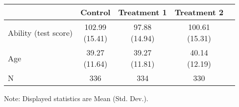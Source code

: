 \renewcommand\cellalign{t}
\begin{threeparttable}
\begin{tabular}{lcccc}
\toprule
 & Control & Treatment 1 & Treatment 2 \\
\midrule
\addlinespace
Ability (test score) & \makecell{102.99\\(15.41)} & \makecell{97.88\\(14.94)} & \makecell{100.61\\(15.31)} \\
Age & \makecell{39.27\\(11.64)} & \makecell{39.27\\(11.81)} & \makecell{40.14\\(12.19)} \\
\midrule
\addlinespace
N & 336 & 334 & 330 \\
\bottomrule
\end{tabular}
\footnotesize Note: Displayed statistics are Mean (Std. Dev.).
\end{threeparttable}